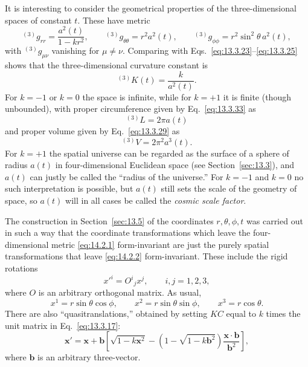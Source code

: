 It is interesting to consider the geometrical properties of the
three-dimensional spaces of constant \(t\). These have metric
\begin{equation}
  {}^{(3)}g_{rr}=\frac{a^2(t)}{1-kr^2},
  \qquad
  {}^{(3)}g_{\theta\theta}=r^2a^2(t),
  \qquad
  {}^{(3)}g_{\phi\phi}=r^2\sin^2\theta\,a^2(t),
  \tag{14.2.2}\label{eq:14.2.2}
\end{equation}
with \({}^{(3)}g_{\mu\nu}\) vanishing for \(\mu\neq\nu\). Comparing with
Eqs.~\eqref{eq:13.3.23}--\eqref{eq:13.3.25} shows that the
three-dimensional curvature constant is
\begin{equation}
  {}^{(3)}K(t)=\frac{k}{a^2(t)}.
  \tag{14.2.3}\label{eq:14.2.3}
\end{equation}
For \(k=-1\) or \(k=0\) the space is infinite, while for \(k=+1\) it is
finite (though unbounded), with proper circumference given by
Eq.~\eqref{eq:13.3.33} as
\begin{equation}
  {}^{(3)}L=2\pi a(t)
  \tag{14.2.4}\label{eq:14.2.4}
\end{equation}
and proper volume given by Eq.~\eqref{eq:13.3.29} as
\begin{equation}
  {}^{(3)}V=2\pi^2a^3(t).
  \tag{14.2.5}\label{eq:14.2.5}
\end{equation}
For \(k=+1\) the spatial universe can be regarded as the surface of a sphere
of radius \(a(t)\) in four-dimensional Euclidean space (see
Section~\ref{sec:13.3}), and \(a(t)\) can justly be called the ``radius of
the universe.'' For \(k=-1\) and \(k=0\) no such interpretation is possible,
but \(a(t)\) still sets the scale of the geometry of space, so \(a(t)\) will
in all cases be called the \emph{cosmic scale factor}.

The construction in Section~\ref{sec:13.5} of the coordinates
\(r,\theta,\phi,t\) was carried out in such a way that the coordinate
transformations which leave the four-dimensional metric
\eqref{eq:14.2.1} form-invariant are just the purely spatial transformations
that leave \eqref{eq:14.2.2} form-invariant. These include the rigid rotations
\begin{equation}
  x'^i=O^i{}_j x^j,
  \qquad i,j=1,2,3,
  \tag{14.2.6}\label{eq:14.2.6}
\end{equation}
where \(O\) is an arbitrary orthogonal matrix. As usual,
\[
  x^1=r\sin\theta\cos\phi,\qquad
  x^2=r\sin\theta\sin\phi,\qquad
  x^3=r\cos\theta.
\]
There are also ``quasitranslations,'' obtained by setting \(KC\) equal to
\(k\) times the unit matrix in Eq.~\eqref{eq:13.3.17}:
\begin{equation}
  \mathbf{x}'
  =
  \mathbf{x}
  +\mathbf{b}
  \left[
    \sqrt{1-k\mathbf{x}^2}
    -
    \left(1-\sqrt{1-k\mathbf{b}^2}\right)
    \frac{\mathbf{x}\cdot\mathbf{b}}{\mathbf{b}^2}
  \right],
  \tag{14.2.7}\label{eq:14.2.7}
\end{equation}
where \(\mathbf{b}\) is an arbitrary three-vector.

